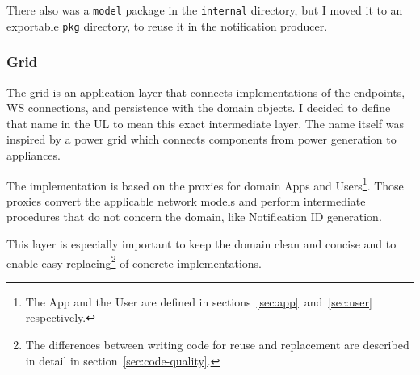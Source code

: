 There also was a \texttt{model} package
in the \texttt{internal} directory,
but I moved it to an exportable \texttt{pkg} directory,
to reuse it in the notification producer.

\subsubsection{Grid}\label{sec:grid}

The grid is an application layer
that connects implementations of
the endpoints, \ac{WS} connections, and persistence
with the domain objects.
I decided to define that name in the \ac{UL}
to mean this exact intermediate layer.
The name itself was inspired by a power grid
which connects components
from power generation
to appliances.

The implementation is based on the proxies
for domain Apps and Users\footnote{
      The App and the User are defined in
      sections~\ref{sec:app}~and~\ref{sec:user}
      respectively.
}.
Those proxies convert the applicable network models
and perform intermediate procedures
that do not concern the domain,
like Notification \ac{ID} generation.

This layer is especially important
to keep the domain clean and concise
and to enable easy replacing\footnote{
      The differences between writing code
      for reuse and replacement are described in detail
      in section~\ref{sec:code-quality}.
}
of concrete implementations.
